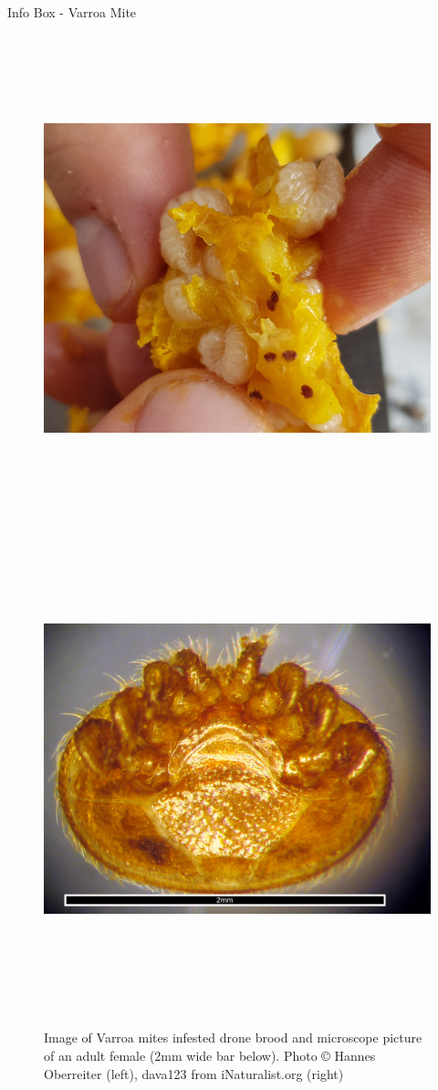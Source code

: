\documentclass{beamer}
\begin{document}
\begin{frame}{}
\begin{columns}[t]
\begin{column}{0.49\textwidth}
{\begin{block}{Info Box - Varroa Mite}
        \begin{figure}
          \centering
          \includegraphics[height=400pt]{img/varroa.jpg}
          \includegraphics[height=400pt]{img/mite_inat.jpg}
          \caption{Image of Varroa mites infested drone brood and microscope picture of an adult female (2mm wide bar below). Photo © Hannes Oberreiter (left), dava123 from iNaturalist.org (right)}
        \end{figure}


\end{block}}
\end{column}
\end{columns}
\end{frame}
\end{document}
